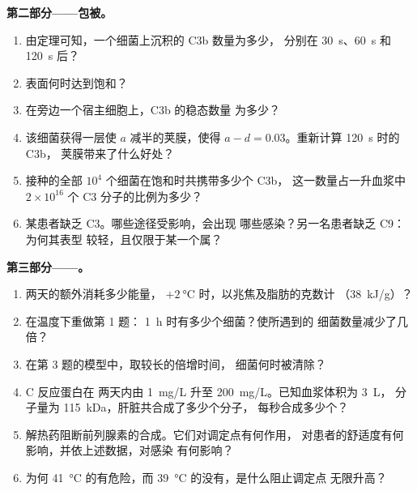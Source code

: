 \begin{problem}
\medskip
\noindent\textbf{第二部分——包被。}
\begin{enumerate}[resume]
  \item 由定理可知，一个细菌上沉积的 C3b 数量为多少，
        分别在 \qty{30}{s}、\qty{60}{s} 和 \qty{120}{s} 后？
  \item 表面何时达到饱和？
  \item 在旁边一个宿主细胞上，C3b 的稳态数量
        为多少？
  \item 该细菌获得一层使 $a$ 减半的荚膜，使得 $a -
        d = 0.03$。重新计算 \qty{120}{s} 时的 C3b，
        荚膜带来了什么好处？
  \item 接种的全部 $10^{4}$ 个细菌在饱和时共携带多少个 C3b，
        这一数量占一升血浆中
        $2\times 10^{16}$ 个 C3 分子的比例为多少？
  \item 某患者缺乏 C3。哪些途径受影响，会出现
        哪些感染？另一名患者缺乏 C9：为何其表型
        较轻，且仅限于某一个属？
\end{enumerate}

\medskip
\noindent\textbf{第三部分——。}
\begin{enumerate}[resume]
  \item 两天的额外消耗多少能量，
        $+\qty{2}{\celsius}$ 时，以兆焦及脂肪的克数计
        （\qty{38}{kJ/g}）？
  \item 在温度下重做第 1 题：
        \qty{1}{h} 时有多少个细菌？使所遇到的
        细菌数量减少了几倍？
  \item 在第 3 题的模型中，取较长的倍增时间，
        细菌何时被清除？
  \item C 反应蛋白在
        两天内由 \qty{1}{mg/L} 升至 \qty{200}{mg/L}。已知血浆体积为 \qty{3}{L}，
        分子量为 \qty{115}{kDa}，肝脏共合成了多少个分子，
        每秒合成多少个？
  \item 解热药阻断前列腺素的合成。它们对调定点有何作用，
        对患者的舒适度有何影响，并依上述数据，对感染
        有何影响？
  \item 为何 \qty{41}{\celsius} 的有危险，而
        \qty{39}{\celsius} 的没有，是什么阻止调定点
        无限升高？
\end{enumerate}


\end{problem}
